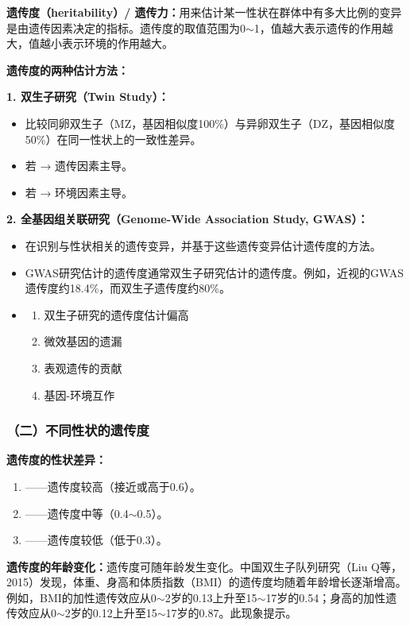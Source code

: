 \begin{keybox}
\textbf{遗传度（heritability）/ 遗传力：}用来估计某一性状在群体中有多大比例的变异是由遗传因素决定的指标。遗传度的取值范围为0$\sim$1，值越大表示遗传的作用越大，值越小表示环境的作用越大。

\textbf{遗传度的两种估计方法：}

\textbf{1. 双生子研究（Twin Study）：}
\begin{itemize}[leftmargin=*]
    \item {}比较同卵双生子（MZ，基因相似度100\%）与异卵双生子（DZ，基因相似度50\%）在同一性状上的一致性差异。
    \item 若 → 遗传因素主导。
    \item 若 → 环境因素主导。
\end{itemize}

\textbf{2. 全基因组关联研究（Genome-Wide Association Study, GWAS）：}
\begin{itemize}[leftmargin=*]
    \item {}在识别与性状相关的遗传变异，并基于这些遗传变异估计遗传度的方法。
    \item {}GWAS研究估计的遗传度通常双生子研究估计的遗传度。例如，近视的GWAS遗传度约18.4\%，而双生子遗传度约80\%。
    \item {}
    \begin{enumerate}[leftmargin=*]
        \item 双生子研究的遗传度估计偏高
        \item 微效基因的遗漏
        \item 表观遗传的贡献
        \item 基因-环境互作
    \end{enumerate}
\end{itemize}
\end{keybox}

\subsubsection{（二）不同性状的遗传度}

\begin{keybox}
\textbf{遗传度的性状差异：}
\begin{enumerate}[leftmargin=*]
    \item {}——遗传度较高（接近或高于0.6）。
    \item {}——遗传度中等（0.4$\sim$0.5）。
    \item {}——遗传度较低（低于0.3）。
\end{enumerate}

\textbf{遗传度的年龄变化：}遗传度可随年龄发生变化。中国双生子队列研究（Liu Q等，2015）发现，体重、身高和体质指数（BMI）的遗传度均随着年龄增长逐渐增高。例如，BMI的加性遗传效应从0$\sim$2岁的0.13上升至15$\sim$17岁的0.54；身高的加性遗传效应从0$\sim$2岁的0.12上升至15$\sim$17岁的0.87。此现象提示。
\end{keybox}


